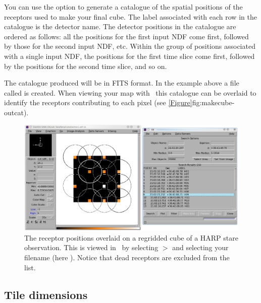 \documentclass[11pt,oneside,chapters]{starlink}
\begin{document}
You can use the option  to generate a catalogue of the
spatial positions of the receptors used to make your final cube. The
label associated with each row in the catalogue is the detector name.
The detector positions in the catalogue are ordered as follows: all
the positions for the first input NDF come first, followed by those
for the second input NDF, etc. Within the group of positions
associated with a single input NDF, the positions for the first time
slice come first, followed by the positions for the second time slice,
and so on.

\begin{terminalv}
\end{terminalv}

The catalogue produced will be in FITS format. In the example above a
file called  is created. When viewing your map with \gaia\ this
catalogue can be overlaid to identify the receptors contributing to
each pixel (see \cref{Figure}{fig:makecube-outcat}{}).

\begin{figure}[h!]
\begin{center}
\includegraphics[width=1\linewidth]{sc20_makecube-outcat}
\caption[Displaying receptor positions in \gaia.]{\label{fig:makecube-outcat}
  The receptor positions overlaid on a regridded cube of a HARP stare
  observation. This is viewed in \gaia\ by selecting
   $>$  and selecting
  your  filename (here ). Notice that dead
  receptors are excluded from the list.}
\end{center}
\end{figure}

\subsection{Tile dimensions}
\end{document}

